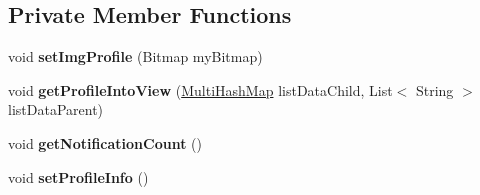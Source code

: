 \subsection*{Private Member Functions}
\begin{DoxyCompactItemize}
\item 
void {\bfseries set\+Img\+Profile} (Bitmap my\+Bitmap)\hypertarget{classcom_1_1example_1_1sebastian_1_1tindertp_1_1InfomationActivity_a6899d6d708d7ab46a646e6613abbb121}{}\label{classcom_1_1example_1_1sebastian_1_1tindertp_1_1InfomationActivity_a6899d6d708d7ab46a646e6613abbb121}

\item 
void {\bfseries get\+Profile\+Into\+View} (\hyperlink{classcom_1_1example_1_1sebastian_1_1tindertp_1_1commonTools_1_1MultiHashMap}{Multi\+Hash\+Map} list\+Data\+Child, List$<$ String $>$ list\+Data\+Parent)\hypertarget{classcom_1_1example_1_1sebastian_1_1tindertp_1_1InfomationActivity_a62e012353e491c8a910bd29899dd9211}{}\label{classcom_1_1example_1_1sebastian_1_1tindertp_1_1InfomationActivity_a62e012353e491c8a910bd29899dd9211}

\item 
void {\bfseries get\+Notification\+Count} ()\hypertarget{classcom_1_1example_1_1sebastian_1_1tindertp_1_1InfomationActivity_aa1834729249cef1209ef8ac329d8742d}{}\label{classcom_1_1example_1_1sebastian_1_1tindertp_1_1InfomationActivity_aa1834729249cef1209ef8ac329d8742d}

\item 
void {\bfseries set\+Profile\+Info} ()\hypertarget{classcom_1_1example_1_1sebastian_1_1tindertp_1_1InfomationActivity_a8d6dd8f815aff54210ffec8c3a1c4890}{}\label{classcom_1_1example_1_1sebastian_1_1tindertp_1_1InfomationActivity_a8d6dd8f815aff54210ffec8c3a1c4890}

\end{DoxyCompactItemize}
